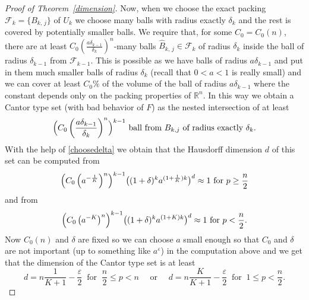 \documentclass[reqno,11pt]{amsart}
\def\epsilon{\varepsilon}
\numberwithin{equation}{section}
\theoremstyle{remark}
\begin{document}
\begin{proof}[Proof of Theorem~\ref{dimension}]
Now, when we choose the exact packing $\mathcal F_k=\{B_{k,\,j}\}$ of $U_k$ we choose many balls with radius exactly $\delta_k$ and the rest is covered by potentially smaller balls. We require that, for some $C_0=C_0(n)$, there are at least $C_0\left(\frac{a\delta_{k-1}}{\delta_k}\right)^n$-many balls $\hat B_{k,\,j}\in\mathcal F_k$ of radius $\delta_k$ inside the ball of radius $\delta_{k-1}$ from $\mathcal F_{k-1}$. This is possible as we have balls of radius $a\delta_{k-1}$ and put in them much smaller balls of radius $\delta_k$ (recall that $0<a<1$ is really small) and we can cover at least $C_0 \%$ of the volume of the ball of radius $a\delta_{k-1}$ where the constant depends only on the packing properties of $\mathbb R^n$. In this way we obtain a Cantor type set (with bad behavior of $F$) 
as the nested intersection of at least 
$$
\Bigl(C_0\left(\frac{a\delta_{k-1}}{\delta_k}\right)^n\Bigr)^{k-1}\text{ ball from }B_{k,j}
\text{ of radius exactly }\delta_k. 
$$
With the help of \eqref{choosedelta} we obtain that the Hausdorff dimension $d$ of this set can be computed from
$$
\Bigl(C_0\left(a^{-\frac{1}{K}}\right)^n\Bigr)^{k-1}
\bigl((1+\delta)^k a^{(1+\frac{1}{K})k}\bigr)^d\approx  1\text{ for }p\geq \frac{n}{2}
$$
and from 
$$
\Bigl(C_0\left(a^{-K}\right)^n\Bigr)^{k-1}
\bigl((1+\delta)^k a^{(1+K)k}\bigr)^d\approx 1\text{ for }p< \frac{n}{2}. 
$$
Now $C_0(n)$ and $\delta$ are fixed so we can choose $a$ small enough so that $C_0$ and $\delta$ are not important (up to something like $a^{\epsilon}$) in the computation above and we get that the dimension of the Cantor type set is at least 
$$
d=n\frac{1}{K+1}-\frac{\epsilon}{2} \  \text{ for } \ \frac{n}{2}\leq p< n \quad \text{ or }\quad 
d=n\frac{K}{K+1}-\frac{\epsilon}{2}\  \text{ for } \ 1\leq p<\frac{n}{2}. 
$$



\end{proof}
\end{document}
